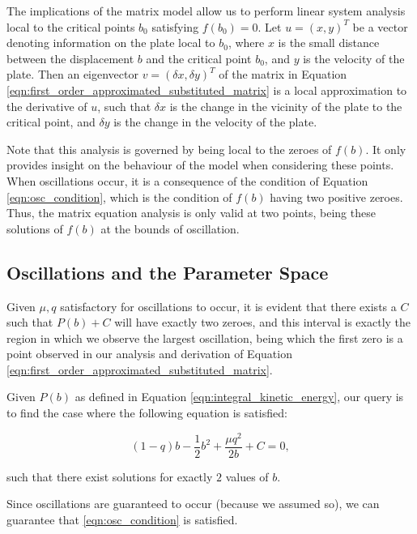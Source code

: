 \documentclass{article}
\begin{document}

The implications of the matrix model allow us to perform linear system analysis local to the critical points $b_0$ satisfying $f(b_0) = 0.$
Let $u=(x,y)^T$ be a vector denoting information on the plate local to $b_0$,
where $x$ is the small distance between the displacement $b$ and the critical point $b_0$,
and $y$ is the velocity of the plate.
Then an eigenvector $v=(\delta x, \delta y)^T$ of the matrix in Equation \ref{eqn:first_order_approximated_substituted_matrix} is a local approximation to the derivative of $u$,
such that $\delta x$ is the change in the vicinity of the plate to the critical point,
and $\delta y$ is the change in the velocity of the plate.



Note that this analysis is governed by being local to the zeroes of $f(b)$.
It only provides insight on the behaviour of the model when considering these points.
When oscillations occur, it is a consequence of the condition of Equation \ref{eqn:osc_condition},
which is the condition of $f(b)$ having two positive zeroes.
Thus, the matrix equation analysis is only valid at two points,
being these solutions of $f(b)$ at the bounds of oscillation.

\subsection[OLD]{Oscillations and the Parameter Space}



Given $\mu, q$ satisfactory for oscillations to occur,
it is evident that there exists a $C$ such that $P(b)+C$ will have exactly two zeroes,
and this interval is exactly the region in which we observe the largest oscillation,
being which the first zero is a point observed in our analysis and derivation of Equation \ref{eqn:first_order_approximated_substituted_matrix}.

Given $P(b)$ as defined in Equation \ref{eqn:integral_kinetic_energy},
our query is to find the case where the following equation is satisfied:

\begin{equation}
    (1-q)b - \frac{1}{2}b^2 + \frac{\mu q^2}{2b} + C = 0,
\end{equation}

such that there exist solutions for exactly $2$ values of $b$.

Since oscillations are guaranteed to occur (because we assumed so),
we can guarantee that \ref{eqn:osc_condition} is satisfied.











\end{document}
